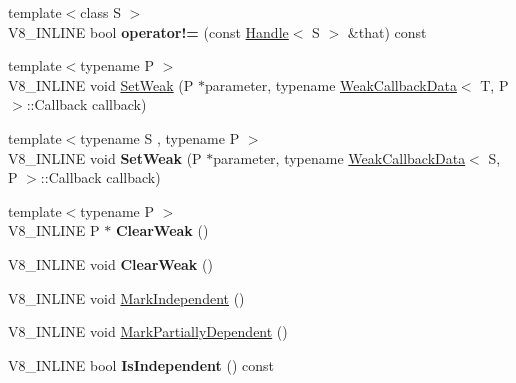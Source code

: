 \begin{DoxyCompactItemize}
\item 
\hypertarget{classv8_1_1PersistentBase_acc30195c1ee4e1f801cab267e6855fd3}{{\footnotesize template$<$class S $>$ }\\V8\-\_\-\-I\-N\-L\-I\-N\-E bool {\bfseries operator!=} (const \hyperlink{classv8_1_1Handle}{Handle}$<$ S $>$ \&that) const }\label{classv8_1_1PersistentBase_acc30195c1ee4e1f801cab267e6855fd3}

\item 
{\footnotesize template$<$typename P $>$ }\\V8\-\_\-\-I\-N\-L\-I\-N\-E void \hyperlink{classv8_1_1PersistentBase_aaf342ece1a4ba926ba62e8d6af7be777}{Set\-Weak} (P $\ast$parameter, typename \hyperlink{classv8_1_1WeakCallbackData}{Weak\-Callback\-Data}$<$ T, P $>$\-::Callback callback)
\item 
\hypertarget{classv8_1_1PersistentBase_a26cacb456e6a02bb8214dfd8a31247c9}{{\footnotesize template$<$typename S , typename P $>$ }\\V8\-\_\-\-I\-N\-L\-I\-N\-E void {\bfseries Set\-Weak} (P $\ast$parameter, typename \hyperlink{classv8_1_1WeakCallbackData}{Weak\-Callback\-Data}$<$ S, P $>$\-::Callback callback)}\label{classv8_1_1PersistentBase_a26cacb456e6a02bb8214dfd8a31247c9}

\item 
\hypertarget{classv8_1_1PersistentBase_a9bedaeaf2be4c905275486b7e6f250d4}{{\footnotesize template$<$typename P $>$ }\\V8\-\_\-\-I\-N\-L\-I\-N\-E P $\ast$ {\bfseries Clear\-Weak} ()}\label{classv8_1_1PersistentBase_a9bedaeaf2be4c905275486b7e6f250d4}

\item 
\hypertarget{classv8_1_1PersistentBase_a11e1d5d27c9969c2dd12fa1e89f53731}{V8\-\_\-\-I\-N\-L\-I\-N\-E void {\bfseries Clear\-Weak} ()}\label{classv8_1_1PersistentBase_a11e1d5d27c9969c2dd12fa1e89f53731}

\item 
V8\-\_\-\-I\-N\-L\-I\-N\-E void \hyperlink{classv8_1_1PersistentBase_aed12b0a54bc5ade1fb44e3bdb3a1fe74}{Mark\-Independent} ()
\item 
V8\-\_\-\-I\-N\-L\-I\-N\-E void \hyperlink{classv8_1_1PersistentBase_a4a876d30dda0dfb812e82bb240e4686e}{Mark\-Partially\-Dependent} ()
\item 
\hypertarget{classv8_1_1PersistentBase_a2ed93b6be1b27c299906935ef35d2114}{V8\-\_\-\-I\-N\-L\-I\-N\-E bool {\bfseries Is\-Independent} () const }\label{classv8_1_1PersistentBase_a2ed93b6be1b27c299906935ef35d2114}


\end{DoxyCompactItemize}
